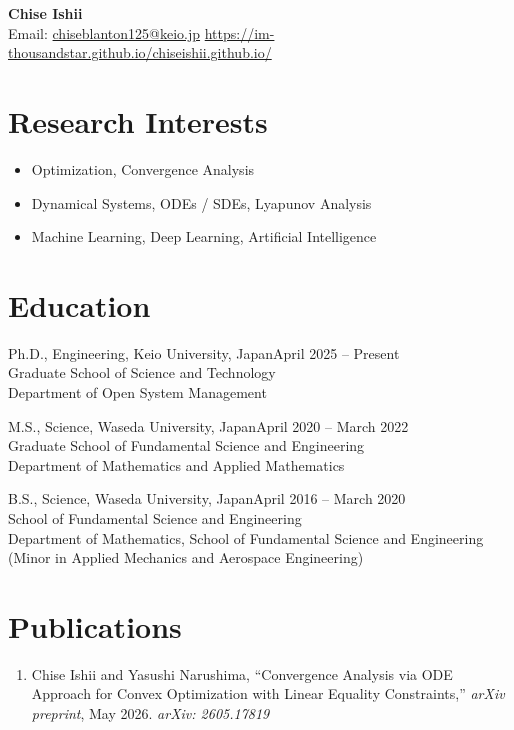 \documentclass[11pt,a4paper]{article}
\newcommand{\educationentry}[4]{%
  #1\hfill #2\\
  #3\\
  #4\par\vspace{4pt}
}
\begin{document}
\begin{center}
    {\LARGE\textbf{Chise Ishii}}\\[5pt]
    {\small Email: \underline{chiseblanton125@keio.jp} \quad \underline{https://im-thousandstar.github.io/chiseishii.github.io/} \quad
    }
  \end{center}

\section{Research Interests}

\begin{itemize}
    \item Optimization, Convergence Analysis
    \item Dynamical Systems, ODEs / SDEs, Lyapunov Analysis
    \item Machine Learning, Deep Learning, Artificial Intelligence
\end{itemize}

\section{Education}

\educationentry
  {Ph.D., Engineering, Keio University, Japan}
  {April 2025 -- Present}
  {Graduate School of Science and Technology}
  {Department of Open System Management}

\educationentry
  {M.S., Science, Waseda University, Japan}
  {April 2020 -- March 2022}
  {Graduate School of Fundamental Science and Engineering}
  {Department of Mathematics and Applied Mathematics}

\educationentry
  {B.S., Science, Waseda University, Japan}
  {April 2016 -- March 2020}
  {School of Fundamental Science and Engineering}
  {Department of Mathematics, School of Fundamental Science and Engineering (Minor in Applied Mechanics and Aerospace Engineering)}

\section{Publications}

\begin{enumerate}
    \item Chise Ishii and Yasushi Narushima,
    ``Convergence Analysis via ODE Approach for Convex Optimization
    with Linear Equality Constraints,''
    \textit{arXiv preprint}, May 2026.
    \textit{arXiv: 2605.17819}
\end{enumerate}
\end{document}
